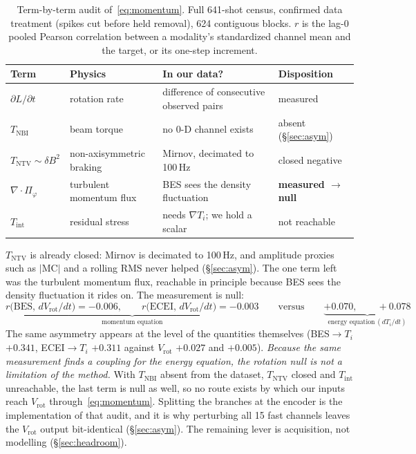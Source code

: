 \documentclass[10pt]{article}
\newcommand{\Ti}{\ensuremath{T_i}}
\newcommand{\Vrot}{\ensuremath{V_\mathrm{rot}}}
\begin{document}
\begin{table}[t]
  \centering
  \caption{Term-by-term audit of~\eqref{eq:momentum}. Full 641-shot census, confirmed
  data treatment (spikes cut before held removal), 624 contiguous blocks. $r$ is the
  lag-0 pooled Pearson correlation between a modality's standardized channel mean and
  the target, or its one-step increment.}
  \label{tab:torque}
  \small
  \begin{tabular}{llll}
    \toprule
    Term & Physics & In our data? & Disposition \\
    \midrule
    $\partial L/\partial t$ & rotation rate & difference of consecutive observed pairs & measured \\
    $T_\mathrm{NBI}$ & beam torque & no 0-D channel exists & absent (\S\ref{sec:asym}) \\
    $T_\mathrm{NTV}\sim\delta B^2$ & non-axisymmetric braking & Mirnov, decimated to 100\,Hz & closed negative \\
    $\nabla\!\cdot\!\Pi_\varphi$ & turbulent momentum flux & BES sees the density fluctuation & \textbf{measured $\rightarrow$ null} \\
    $T_\mathrm{int}$ & residual stress & needs $\nabla T_i$; we hold a scalar & not reachable \\
    \bottomrule
  \end{tabular}
\end{table}

$T_\mathrm{NTV}$ is already closed: Mirnov is decimated to 100\,Hz, and amplitude
proxies such as $|\mathrm{MC}|$ and a rolling RMS never helped (\S\ref{sec:asym}).
The one term left was the turbulent momentum flux, reachable in principle because BES
sees the density fluctuation it rides on. The measurement is null:
%
\[
  \underbrace{r\bigl(\mathrm{BES},\,d\Vrot/dt\bigr) = -0.006,\qquad
              r\bigl(\mathrm{ECEI},\,d\Vrot/dt\bigr) = -0.003}_{\text{momentum equation}}
  \qquad\text{versus}\qquad
  \underbrace{+0.070,\qquad +0.078}_{\text{energy equation}\,(d\Ti/dt)}
\]
%
The same asymmetry appears at the level of the quantities themselves
(BES$\rightarrow$\Ti{} $+0.341$, ECEI$\rightarrow$\Ti{} $+0.311$ against \Vrot{}
$+0.027$ and $+0.005$). \emph{Because the same measurement finds a coupling for the
energy equation, the rotation null is not a limitation of the method.} With
$T_\mathrm{NBI}$ absent from the dataset, $T_\mathrm{NTV}$ closed and
$T_\mathrm{int}$ unreachable, the last term is null as well, so no route exists by
which our inputs reach \Vrot{} through~\eqref{eq:momentum}. Splitting the branches at
the encoder is the implementation of that audit, and it is why perturbing all 15 fast
channels leaves the \Vrot{} output bit-identical (\S\ref{sec:asym}). The remaining
lever is acquisition, not modelling (\S\ref{sec:headroom}).
\end{document}

